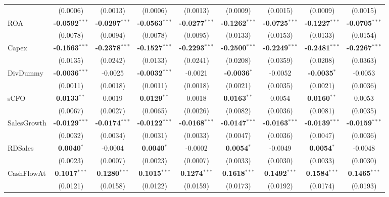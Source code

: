 \documentclass[11pt,a4paper]{article}
\begin{document}
\begin{table}[htbp]
\begin{tabular}{lcccccccc}
 & (0.0006) & (0.0013) & (0.0006) & (0.0013) & (0.0009) & (0.0015) & (0.0009) & (0.0015) \\
ROA & \textbf{-0.0592}$^{***}$ & \textbf{-0.0297}$^{***}$ & \textbf{-0.0563}$^{***}$ & \textbf{-0.0277}$^{***}$ & \textbf{-0.1262}$^{***}$ & \textbf{-0.0725}$^{***}$ & \textbf{-0.1227}$^{***}$ & \textbf{-0.0705}$^{***}$ \\
 & (0.0078) & (0.0094) & (0.0078) & (0.0095) & (0.0133) & (0.0153) & (0.0133) & (0.0154) \\
Capex & \textbf{-0.1563}$^{***}$ & \textbf{-0.2378}$^{***}$ & \textbf{-0.1527}$^{***}$ & \textbf{-0.2293}$^{***}$ & \textbf{-0.2500}$^{***}$ & \textbf{-0.2249}$^{***}$ & \textbf{-0.2481}$^{***}$ & \textbf{-0.2267}$^{***}$ \\
 & (0.0135) & (0.0242) & (0.0133) & (0.0241) & (0.0208) & (0.0359) & (0.0208) & (0.0363) \\
DivDummy & \textbf{-0.0036}$^{***}$ & -0.0025 & \textbf{-0.0032}$^{***}$ & -0.0021 & \textbf{-0.0036}$^{*}$ & -0.0052 & \textbf{-0.0035}$^{*}$ & -0.0053 \\
 & (0.0011) & (0.0018) & (0.0011) & (0.0018) & (0.0021) & (0.0035) & (0.0021) & (0.0036) \\
sCFO & \textbf{0.0133}$^{**}$ & 0.0019 & \textbf{0.0129}$^{**}$ & 0.0018 & \textbf{0.0163}$^{**}$ & 0.0054 & \textbf{0.0160}$^{**}$ & 0.0053 \\
 & (0.0067) & (0.0027) & (0.0065) & (0.0026) & (0.0082) & (0.0036) & (0.0081) & (0.0035) \\
SalesGrowth & \textbf{-0.0129}$^{***}$ & \textbf{-0.0174}$^{***}$ & \textbf{-0.0122}$^{***}$ & \textbf{-0.0168}$^{***}$ & \textbf{-0.0147}$^{***}$ & \textbf{-0.0163}$^{***}$ & \textbf{-0.0139}$^{***}$ & \textbf{-0.0159}$^{***}$ \\
 & (0.0032) & (0.0034) & (0.0031) & (0.0033) & (0.0047) & (0.0036) & (0.0047) & (0.0036) \\
RDSales & \textbf{0.0040}$^{*}$ & -0.0004 & \textbf{0.0040}$^{*}$ & -0.0002 & \textbf{0.0054}$^{*}$ & -0.0049 & \textbf{0.0054}$^{*}$ & -0.0048 \\
 & (0.0023) & (0.0007) & (0.0023) & (0.0007) & (0.0033) & (0.0030) & (0.0033) & (0.0030) \\
CashFlowAt & \textbf{0.1017}$^{***}$ & \textbf{0.1280}$^{***}$ & \textbf{0.1015}$^{***}$ & \textbf{0.1274}$^{***}$ & \textbf{0.1618}$^{***}$ & \textbf{0.1492}$^{***}$ & \textbf{0.1584}$^{***}$ & \textbf{0.1465}$^{***}$ \\
 & (0.0121) & (0.0158) & (0.0122) & (0.0159) & (0.0173) & (0.0192) & (0.0174) & (0.0193) \\

\end{tabular}
\end{table}
\end{document}
